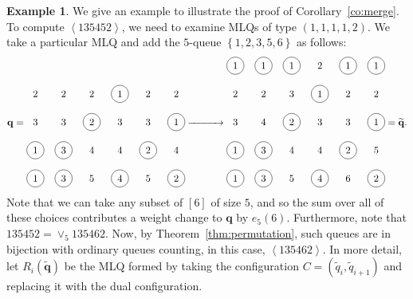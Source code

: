 \documentclass[submission]{FPSAC2018}
\newcommand{\swt}[1]{\left\langle #1 \right\rangle} %
\newcommand{\merge}[2]{\vee_{#1}#2} %
\newcommand{\qq}{\mathbf{q}}
\newcommand{\set}[1]{\left\{ #1 \right\}}
\newcommand{\ive}[1]{\left[ #1 \right]}
\theoremstyle{plain}
\theoremstyle{definition}
\newtheorem{example}[thm]{Example}
\numberwithin{equation}{section}
\begin{document}
\begin{example}
We give an example to illustrate the proof of Corollary~\ref{co:merge}.
To compute $\swt{135452}$, we need to examine MLQs of type $(1,1,1,1,2)$.
We take a particular MLQ and add the $5$-queue $\set{1,2,3,5,6}$ as follows:
\[
\qq =
\begin{tikzpicture}[baseline=82]
\node at (0, 4){2};\node at (1, 4){2};\node at (2, 4){2};\node[circle, draw=black] at (3, 4){1};\node at (4, 4){2};\node at (5, 4){2};\node at (0, 3){3};\node at (1, 3){3};\node[circle, draw=black] at (2, 3){2};\node at (3, 3){3};\node at (4, 3){3};\node[circle, draw=black] at (5, 3){1};\node[circle, draw=black] at (0, 2){1};\node[circle, draw=black] at (1, 2){3};\node at (2, 2){4};\node at (3, 2){4};\node[circle, draw=black] at (4, 2){2};\node at (5, 2){4};\node[circle, draw=black] at (0, 1){1};\node[circle, draw=black] at (1, 1){3};\node at (2, 1){5};\node[circle, draw=black] at (3, 1){4};\node at (4, 1){5};\node[circle, draw=black] at (5, 1){2};
\end{tikzpicture}
\xrightarrow{\hspace{30pt}}
\begin{tikzpicture}[baseline=82]
\node[circle, draw=black] at (0, 5){1};\node[circle, draw=black] at (1, 5){1};\node[circle, draw=black] at (2, 5){1};\node at (3, 5){2};\node[circle, draw=black] at (4, 5){1};\node[circle, draw=black] at (5, 5){1};\node at (0, 4){2};\node at (1, 4){2};\node at (2, 4){3};\node[circle, draw=black] at (3, 4){1};\node at (4, 4){2};\node at (5, 4){2};\node at (0, 3){3};\node at (1, 3){4};\node[circle, draw=black] at (2, 3){2};\node at (3, 3){3};\node at (4, 3){3};\node[circle, draw=black] at (5, 3){1};\node[circle, draw=black] at (0, 2){1};\node[circle, draw=black] at (1, 2){3};\node at (2, 2){4};\node at (3, 2){4};\node[circle, draw=black] at (4, 2){2};\node at (5, 2){5};\node[circle, draw=black] at (0, 1){1};\node[circle, draw=black] at (1, 1){3};\node at (2, 1){5};\node[circle, draw=black] at (3, 1){4};\node at (4, 1){6};\node[circle, draw=black] at (5, 1){2};
\end{tikzpicture}
= \widetilde{\qq}.
\]
Note that we can take any subset of $\ive{6}$ of size $5$, and so the sum over all of these choices contributes a weight change to $\qq$ by $e_5(6)$.
Furthermore, note that $135452 = \merge{5}{135462}$.
Now, by Theorem~\ref{thm:permutation}, such queues are in bijection with ordinary queues counting, in this case, $\swt{135462}$.
In more detail, let $R_i(\widetilde{\qq})$ be the MLQ formed by taking the configuration $C = (\widetilde{q}_i, \widetilde{q}_{i+1})$ and replacing it with the dual configuration.

\end{example}
\end{document}
